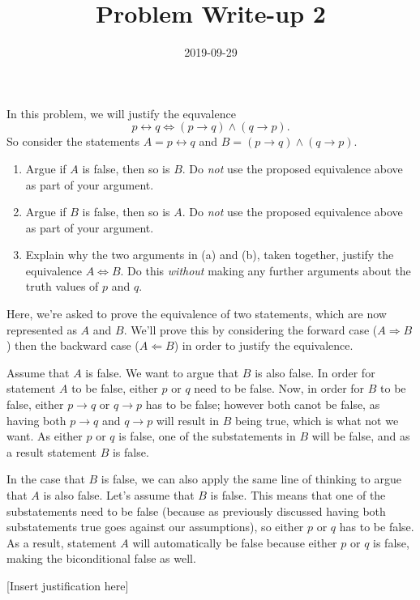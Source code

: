 \documentclass[a4paper,12pt]{article}
\title{Problem Write-up 2}
\date{2019-09-29}
\begin{document}
    \begin{problem}
        In this problem, we will justify the equvalence \[p \leftrightarrow q \Leftrightarrow (p \to q) \wedge (q \to p).\]
        So consider the statements \(A = p \leftrightarrow q\) and \(B = (p \to q) \wedge (q \to p)\).

        \begin{enumerate}
                \item Argue if \(A\) is false, then so is \(B\). Do \textit{not} use the proposed equivalence above as part of your argument.
                \item Argue if \(B\) is false, then so is \(A\). Do \textit{not} use the proposed equivalence above as part of your argument.
                \item Explain why the two arguments in (a) and (b), taken together, justify the equivalence \(A \Leftrightarrow B\). Do this \textit{without} making any further arguments about the truth values of \(p\) and \(q\).
        \end{enumerate}
    \end{problem}

    \begin{answer}
        Here, we're asked to prove the equivalence of two statements, which are now represented as \(A\) and \(B\). We'll prove this by considering the forward case (\(A \Rightarrow B\)) then the backward case (\( A \Leftarrow B \)) in order to justify the equivalence.

        Assume that \(A\) is false. We want to argue that \(B\) is also false. In order for statement \(A\) to be false, either \(p\) or \(q\) need to be false. Now, in order for \(B\) to be false, either \(p \to q\) or \(q \to p\) has to be false; however both canot be false, as having both \(p \to q\) and \(q \to p\) will result in \(B\) being true, which is what not we want. As either \(p\) or \(q\) is false, one of the substatements in \(B\) will be false, and as a result statement \(B\) is false.

        In the case that \(B\) is false, we can also apply the same line of thinking to argue that \(A\) is also false. Let's assume that \(B\) is false. This means that one of the substatements need to be false (because as previously discussed having both substatements true goes against our assumptions), so either \(p\) or \(q\) has to be false. As a result, statement \(A\) will automatically be false because either \(p\) or \(q\) is false, making the biconditional false as well.

        [Insert justification here]
    \end{answer}
\end{document}
